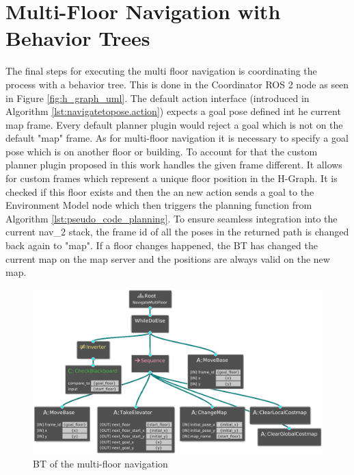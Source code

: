 \section{Multi-Floor Navigation with Behavior Trees}
\label{sec:multi_floor_behavior_trees}
The final steps for executing the multi floor navigation is coordinating the process with a behavior tree. This is done in the Coordinator ROS 2 node as seen in Figure \ref{fig:h_graph_uml}. The default action interface (introduced in Algorithm \ref{lst:navigatetopose.action}) expects a goal pose defined int he current map frame. Every default planner plugin would reject a goal which is not on the default "map" frame. As for multi-floor navigation it is necessary to specify a goal pose which is on another floor or building. To account for that the custom planner plugin proposed in this work handles the given frame different. It allows for custom frames which represent a unique floor position in the H-Graph. It is checked if this floor exists and then the an new action sends a goal to the Environment Model node which then triggers the planning function from Algorithm \ref{lst:pseudo_code_planning}. To ensure seamless integration into the current \gls{nav_2} stack, the frame id of all the poses in the returned path is changed back again to "map". If a floor changes happened, the BT has changed the current map on the map server and the positions are always valid on the new map.

\begin{figure}[h]
    \centering
    \includegraphics[width=\textwidth]{figures/50_implementation/bt_navigate_multi_floor.png}
    \caption[BT of the multi-floor navigation]{BT of the multi-floor navigation}
    \label{fig:bt_navigate_multi_floor}
\end{figure}

